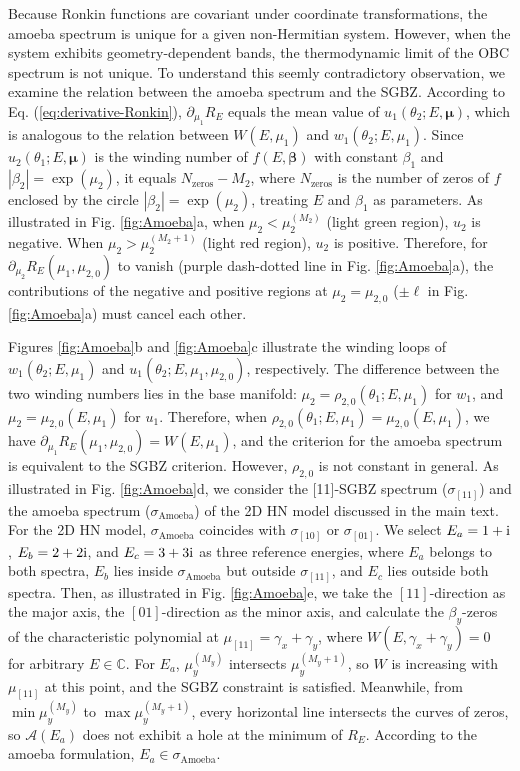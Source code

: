 Because Ronkin functions are covariant under coordinate transformations,
the amoeba spectrum is unique for a given non-Hermitian system. However,
when the system exhibits geometry-dependent bands, the thermodynamic
limit of the OBC spectrum is not unique. To understand this seemly
contradictory observation, we examine the relation between the amoeba
spectrum and the SGBZ. According to Eq. (\ref{eq:derivative-Ronkin}),
$\partial_{\mu_{1}}R_{E}$ equals the mean value of $u_{1}(\theta_{2};E,\boldsymbol{\mu})$,
which is analogous to the relation between $W(E,\mu_{1})$ and $w_{1}(\theta_{2};E,\mu_{1})$.
Since $u_{2}(\theta_{1};E,\boldsymbol{\mu})$ is the winding number
of $f(E,\boldsymbol{\beta})$ with constant $\beta_{1}$ and $|\beta_{2}|=\exp(\mu_{2})$,
it equals $N_{\text{zeros}}-M_{2}$, where $N_{\text{zeros}}$ is
the number of zeros of $f$ enclosed by the circle $|\beta_{2}|=\exp(\mu_{2})$,
treating $E$ and $\beta_{1}$ as parameters. As illustrated in Fig.
\ref{fig:Amoeba}a, when $\mu_{2}<\mu_{2}^{(M_{2})}$ (light green
region), $u_{2}$ is negative. When $\mu_{2}>\mu_{2}^{(M_{2}+1)}$
(light red region), $u_{2}$ is positive. Therefore, for $\partial_{\mu_{2}}R_{E}(\mu_{1},\mu_{2,0})$
to vanish (purple dash-dotted line in Fig. \ref{fig:Amoeba}a), the
contributions of the negative and positive regions at $\mu_{2}=\mu_{2,0}$
($\pm\ell$ in Fig. \ref{fig:Amoeba}a) must cancel each other.

Figures \ref{fig:Amoeba}b and \ref{fig:Amoeba}c illustrate the winding
loops of $w_{1}(\theta_{2};E,\mu_{1})$ and $u_{1}(\theta_{2};E,\mu_{1},\mu_{2,0})$,
respectively. The difference between the two winding numbers lies
in the base manifold: $\mu_{2}=\rho_{2,0}(\theta_{1};E,\mu_{1})$
for $w_{1}$, and $\mu_{2}=\mu_{2,0}(E,\mu_{1})$ for $u_{1}$. Therefore,
when $\rho_{2,0}(\theta_{1};E,\mu_{1})=\mu_{2,0}(E,\mu_{1})$, we
have $\partial_{\mu_{1}}R_{E}(\mu_{1},\mu_{2,0})=W(E,\mu_{1})$, and
the criterion for the amoeba spectrum is equivalent to the SGBZ criterion.
However, $\rho_{2,0}$ is not constant in general. As illustrated
in Fig. \ref{fig:Amoeba}d, we consider the {[}11{]}-SGBZ spectrum
($\sigma_{[11]}$) and the amoeba spectrum ($\sigma_{\text{Amoeba}}$)
of the 2D HN model discussed in the main text. For the 2D HN model,
$\sigma_{\text{Amoeba}}$ coincides with $\sigma_{[10]}$ or $\sigma_{[01]}$.
We select $E_{a}=1+\mathrm{i}$, $E_{b}=2+2\mathrm{i}$, and $E_{c}=3+3\mathrm{i}$
as three reference energies, where $E_{a}$ belongs to both spectra,
$E_{b}$ lies inside $\sigma_{\text{Amoeba}}$ but outside $\sigma_{[11]}$,
and $E_{c}$ lies outside both spectra. Then, as illustrated in Fig.
\ref{fig:Amoeba}e, we take the $[11]$-direction as the major axis,
the $[01]$-direction as the minor axis, and calculate the $\beta_{y}$-zeros
of the characteristic polynomial at $\mu_{[11]}=\gamma_{x}+\gamma_{y}$,
where $W(E,\gamma_{x}+\gamma_{y})=0$ for arbitrary $E\in\mathbb{C}$.
For $E_{a}$, $\mu_{y}^{(M_{y})}$ intersects $\mu_{y}^{(M_{y}+1)}$,
so $W$ is increasing with $\mu_{[11]}$ at this point, and the SGBZ
constraint is satisfied. Meanwhile, from $\min\mu_{y}^{(M_{y})}$
to $\max\mu_{y}^{(M_{y}+1)}$, every horizontal line intersects the
curves of zeros, so $\mathcal{A}(E_{a})$ does not exhibit a hole
at the minimum of $R_{E}$. According to the amoeba formulation, $E_{a}\in\sigma_{\text{Amoeba}}$.

